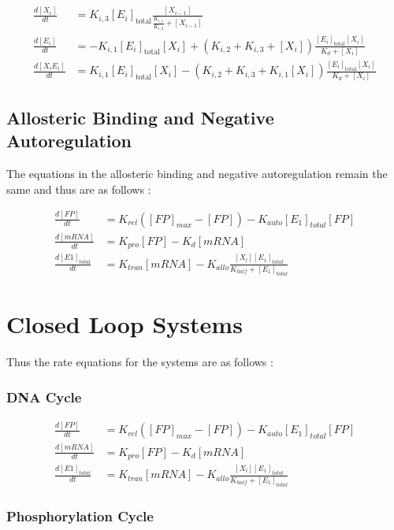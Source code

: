 \begin{align*}
    \frac{d[X_i]}{dt} &= K_{i,3}[E_i]_{\text{total}} \frac{[X_{i-1}]}{\frac{K_{i,1}}{K_{i,2}} + [X_{i-1}]}\\
    \frac{d[E_i]}{dt} &= -K_{i,1}[E_i]_{\text{total}}[X_i] + (K_{i,2} + K_{i,3} + [X_i])\frac{[E_i]_{\text{total}}[X_i]}{K_d + [X_i]}\\
    \frac{d[X_iE_i]}{dt} &= K_{i,1}[E_i]_{\text{total}}[X_i] - (K_{i,2} + K_{i,3} + K_{i,1}[X_i])\frac{[E_i]_{\text{total}}[X_i]}{K_d + [X_i]}
\end{align*}

\subsection*{Allosteric Binding and Negative Autoregulation}
The equations in the allosteric binding and negative 
autoregulation remain the same and thus are as follows :

\begin{align*}
    \frac{d[FP]}{dt} &= K_{rel}([FP]_{max} - [FP]) - K_{auto}[E_1]_{total}[FP]\\
    \frac{d[mRNA]}{dt} &= K_{pro}[FP] - K_d[mRNA]\\
    \frac{d[E1]_{total}}{dt} &= K_{tran}[mRNA] - K_{allo}\frac{[X_l][E_1]_{total}}{K_{half} + [E_1]_{total}}
\end{align*}

\section*{Closed Loop Systems}
Thus the rate equations for the systems are as follows :
\subsubsection*{DNA Cycle}
\begin{align*}
    \frac{d[FP]}{dt} &= K_{rel}([FP]_{max} - [FP]) - K_{auto}[E_1]_{total}[FP]\\
    \frac{d[mRNA]}{dt} &= K_{pro}[FP] - K_d[mRNA]\\
    \frac{d[E1]_{total}}{dt} &= K_{tran}[mRNA] - K_{allo}\frac{[X_l][E_1]_{total}}{K_{half} + [E_1]_{total}}
\end{align*}

\subsubsection*{Phosphorylation Cycle}

